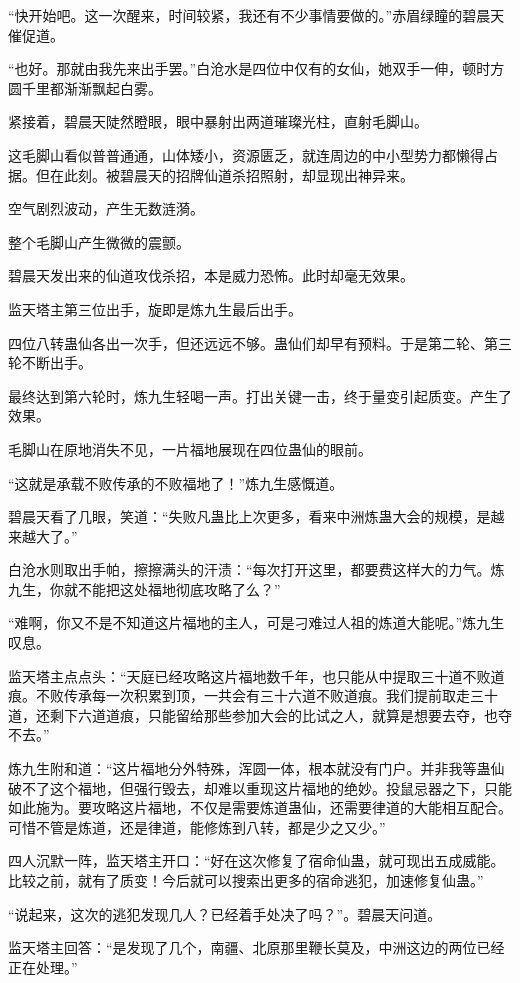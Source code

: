 \begin{this_body}
“快开始吧。这一次醒来，时间较紧，我还有不少事情要做的。”赤眉绿瞳的碧晨天催促道。

“也好。那就由我先来出手罢。”白沧水是四位中仅有的女仙，她双手一伸，顿时方圆千里都渐渐飘起白雾。

紧接着，碧晨天陡然瞪眼，眼中暴射出两道璀璨光柱，直射毛脚山。

这毛脚山看似普普通通，山体矮小，资源匮乏，就连周边的中小型势力都懒得占据。但在此刻。被碧晨天的招牌仙道杀招照射，却显现出神异来。

空气剧烈波动，产生无数涟漪。

整个毛脚山产生微微的震颤。

碧晨天发出来的仙道攻伐杀招，本是威力恐怖。此时却毫无效果。

监天塔主第三位出手，旋即是炼九生最后出手。

四位八转蛊仙各出一次手，但还远远不够。蛊仙们却早有预料。于是第二轮、第三轮不断出手。

最终达到第六轮时，炼九生轻喝一声。打出关键一击，终于量变引起质变。产生了效果。

毛脚山在原地消失不见，一片福地展现在四位蛊仙的眼前。

“这就是承载不败传承的不败福地了！”炼九生感慨道。

碧晨天看了几眼，笑道：“失败凡蛊比上次更多，看来中洲炼蛊大会的规模，是越来越大了。”

白沧水则取出手帕，擦擦满头的汗渍：“每次打开这里，都要费这样大的力气。炼九生，你就不能把这处福地彻底攻略了么？”

“难啊，你又不是不知道这片福地的主人，可是刁难过人祖的炼道大能呢。”炼九生叹息。

监天塔主点点头：“天庭已经攻略这片福地数千年，也只能从中提取三十道不败道痕。不败传承每一次积累到顶，一共会有三十六道不败道痕。我们提前取走三十道，还剩下六道道痕，只能留给那些参加大会的比试之人，就算是想要去夺，也夺不去。”

炼九生附和道：“这片福地分外特殊，浑圆一体，根本就没有门户。并非我等蛊仙破不了这个福地，但强行毁去，却难以重现这片福地的绝妙。投鼠忌器之下，只能如此施为。要攻略这片福地，不仅是需要炼道蛊仙，还需要律道的大能相互配合。可惜不管是炼道，还是律道，能修炼到八转，都是少之又少。”

四人沉默一阵，监天塔主开口：“好在这次修复了宿命仙蛊，就可现出五成威能。比较之前，就有了质变！今后就可以搜索出更多的宿命逃犯，加速修复仙蛊。”

“说起来，这次的逃犯发现几人？已经着手处决了吗？”。碧晨天问道。

监天塔主回答：“是发现了几个，南疆、北原那里鞭长莫及，中洲这边的两位已经正在处理。”


\end{this_body}
